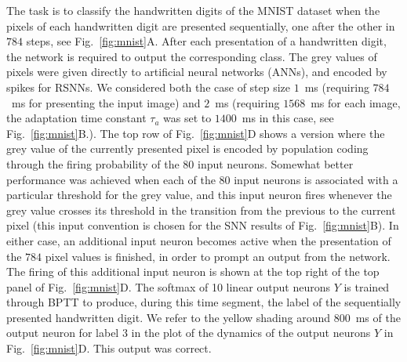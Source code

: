 \documentclass{article} \pdfoutput=1
\begin{document}
The task is to classify the handwritten digits of the MNIST dataset when the pixels of each handwritten digit are presented sequentially, one after the other in $784$ steps, see Fig.~\ref{fig:mnist}A.
After each presentation of a handwritten digit, the network is required to output the corresponding class.
The grey values of pixels were given directly to artificial neural networks (ANNs), and encoded by spikes for RSNNs. We considered both the case of step size $1$~ms (requiring $784$~ms for presenting the input image) and $2$~ms (requiring $1568$~ms for each image, the adaptation time constant $\tau_a$ was set to $1400$~ms in this case, see Fig.~\ref{fig:mnist}B.).
The top row of  Fig.~\ref{fig:mnist}D shows a version where the grey value of the currently presented pixel is encoded by population coding through the firing probability of the $80$ input neurons.
Somewhat better performance was achieved when each of the $80$ input neurons is associated with a particular threshold for the grey value, and this input neuron fires whenever the grey value crosses its threshold in the transition from the previous to the current pixel (this input convention is chosen for the SNN results of Fig.~\ref{fig:mnist}B).
In either case, an additional input neuron becomes active when the presentation of the $784$ pixel values is finished, in order to prompt an output from the network.
The firing of this additional input neuron is shown at the top right of the top panel of Fig.~\ref{fig:mnist}D.
The softmax of 10 linear output neurons $Y$ is trained through BPTT to produce, during this time segment, the label of the sequentially presented handwritten digit.
We refer to the yellow shading around $800$~ms of the output neuron for label 3 in the plot of the dynamics of the output neurons $Y$ in Fig.~\ref{fig:mnist}D. This output was correct.
\end{document}
